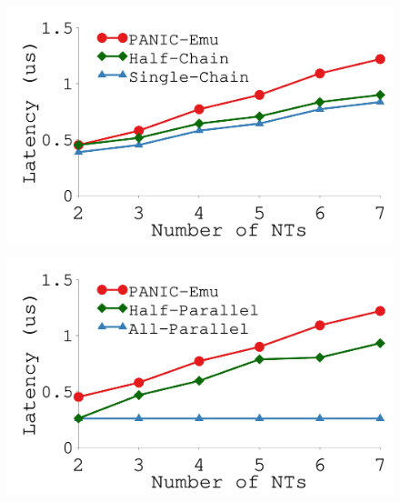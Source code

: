 {\begin{figure}[th]
\begin{minipage}{\figWidthSix}
\end{minipage}
\begin{minipage}{1.65in}
\begin{center}
\centerline{\includegraphics[width=\columnwidth]{Figures/g_plot_nt_chain.pdf}}
\vspace{-0.1in}
{
}
\end{center}
\end{minipage}
\begin{minipage}{1.65in}
\begin{center}
\centerline{\includegraphics[width=\columnwidth]{Figures/g_plot_nt_parallel.pdf}}
\vspace{-0.1in}
{
}
\end{center}
\end{minipage}
\vspace{-0.1in}
\end{figure}
}